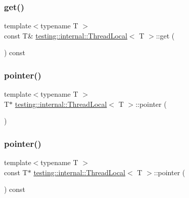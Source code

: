\subsubsection{\texorpdfstring{get()}{get()}}
{\footnotesize\ttfamily template$<$typename T $>$ \\
const T\& \hyperlink{classtesting_1_1internal_1_1ThreadLocal}{testing\+::internal\+::\+Thread\+Local}$<$ T $>$\+::get (\begin{DoxyParamCaption}{ }\end{DoxyParamCaption}) const\hspace{0.3cm}{\ttfamily [inline]}}

\mbox{\label{classtesting_1_1internal_1_1ThreadLocal_a882f57fed4b074de83693c0c0fe62858}} 
\subsubsection{\texorpdfstring{pointer()}{pointer()}\hspace{0.1cm}{\footnotesize\ttfamily [1/2]}}
{\footnotesize\ttfamily template$<$typename T $>$ \\
T$\ast$ \hyperlink{classtesting_1_1internal_1_1ThreadLocal}{testing\+::internal\+::\+Thread\+Local}$<$ T $>$\+::pointer (\begin{DoxyParamCaption}{ }\end{DoxyParamCaption})\hspace{0.3cm}{\ttfamily [inline]}}

\mbox{\label{classtesting_1_1internal_1_1ThreadLocal_a57e45bb60e3cd94abb04fa449e9f0367}} 
\subsubsection{\texorpdfstring{pointer()}{pointer()}\hspace{0.1cm}{\footnotesize\ttfamily [2/2]}}
{\footnotesize\ttfamily template$<$typename T $>$ \\
const T$\ast$ \hyperlink{classtesting_1_1internal_1_1ThreadLocal}{testing\+::internal\+::\+Thread\+Local}$<$ T $>$\+::pointer (\begin{DoxyParamCaption}{ }\end{DoxyParamCaption}) const\hspace{0.3cm}{\ttfamily [inline]}}

